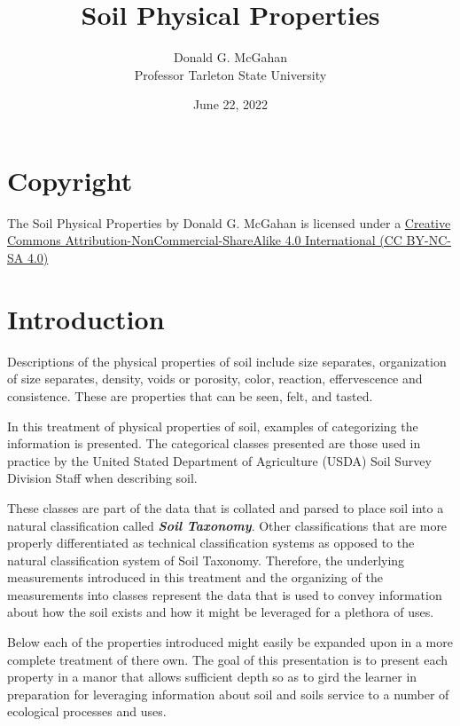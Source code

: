 \documentclass[letterpaper, 12pt]{article}
\title{Soil Physical Properties}
\author{Donald G. McGahan\\ Professor Tarleton State University}
\date{June 22, 2022}
\begin{document}
\maketitle

\section*{Copyright}

The Soil Physical Properties by Donald G. McGahan is licensed under a \href{https://creativecommons.org/licenses/by-nc-sa/4.0/}{Creative Commons Attribution-NonCommercial-ShareAlike 4.0 International (CC BY-NC-SA 4.0)} 

\tableofcontents
\listoffigures
\listoftables

\section{Introduction}
\label{introduction}

Descriptions of the physical properties of soil include size separates, organization of size separates, density, voids or porosity, color, reaction, effervescence and consistence.  These are properties that can be seen, felt, and tasted.

In this treatment of physical properties of soil, examples of categorizing the information is presented. The categorical classes presented are those used in practice by the United Stated Department of Agriculture (USDA) Soil Survey Division Staff when describing soil.

These classes are part of the data that is collated and parsed to place soil into a natural classification called \textbf{\textit{Soil Taxonomy}}. Other classifications that are more properly differentiated as technical classification systems as opposed to the natural classification system of Soil Taxonomy. Therefore, the underlying measurements introduced in this treatment and the organizing of the measurements into classes represent the data that is used to convey information about how the soil exists and how it might be leveraged for a plethora of uses.

Below each of the properties introduced might easily be expanded upon in a more complete treatment of there own. The goal of this presentation is to present each property in a manor that allows sufficient depth so as to gird the learner in preparation for leveraging information about soil and soils service to a number of ecological processes and uses.
\end{document}
